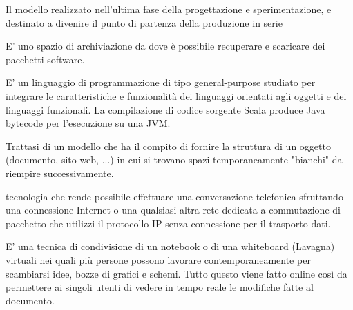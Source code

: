 \documentclass{scalatekids-article}
\begin{document}

 Il modello realizzato nell’ultima fase della progettazione e sperimentazione, e destinato a divenire il punto di partenza della produzione in serie



 E' uno spazio di archiviazione da dove è possibile recuperare e scaricare dei pacchetti software.


 E' un linguaggio di programmazione di tipo general-purpose studiato per integrare le caratteristiche e funzionalità dei linguaggi orientati agli oggetti e dei linguaggi funzionali. La compilazione di codice sorgente Scala produce Java bytecode per l'esecuzione su una JVM.


 Trattasi di un modello che ha il compito di fornire la struttura di un oggetto (documento, sito web, ...) in cui si trovano spazi temporaneamente "bianchi" da riempire successivamente.



 tecnologia che rende possibile effettuare una conversazione telefonica sfruttando una connessione Internet o una qualsiasi altra rete dedicata a commutazione di pacchetto che utilizzi il protocollo IP senza connessione per il trasporto dati.


 E' una tecnica di condivisione di un notebook o di una whiteboard (Lavagna) virtuali nei quali più persone possono lavorare contemporaneamente per scambiarsi idee, bozze di grafici e schemi.
Tutto questo viene fatto online così da permettere ai singoli utenti di vedere in tempo reale le modifiche fatte al documento.



\end{document}
